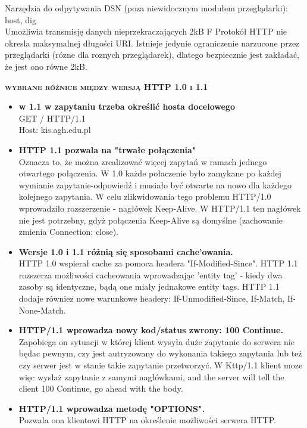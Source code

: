 Narzędzia do odpytywania DSN (poza niewidocznym modułem przeglądarki): host, dig\\




\vspace{0.4cm}
\noindent 
{Umożliwia transmisję danych nieprzekraczających 2kB}
{F}
{Protokół HTTP nie okresla maksymalnej długości URI. Istnieje jedynie ograniczenie narzucone przez przeglądarki (rózne dla roznych przeglądarek), dlatego bezpiecznie  jest zakładać, że jest ono równe 2kB.}
{\\}

\textsc{\textbf{wybrane różnice między wersją HTTP 1.0 i 1.1}}
\begin{itemize}

\item{\textbf{w  1.1 w zapytaniu trzeba określić hosta docelowego}\\
GET / HTTP/1.1 \\
Host: kis.agh.edu.pl}
\item \textbf{HTTP 1.1 pozwala na "trwałe połączenia"} \\ 
Oznacza to, że można zrealizować więcej zapytań w ramach jednego otwartego połączenia. W 1.0 każde połaczenie było zamykane po każdej wymianie zapytanie-odpowiedź i musiało być otwarte na nowo dla każdego kolejnego zapytania. W celu zlikwidowania tego problemu HTTP/1.0 wprowadziło rozszerzenie - nagłówek Keep-Alive. W HTTP/1.1 ten nagłówek nie jest potrzebny, gdyż połączenia Keep-Alive są domyślne (zachowanie zmienia Connection: close).

\item \textbf{Wersje 1.0 i 1.1 różnią się sposobami cache'owania.} \\
HTTP 1.0 wspierał cache za pomoca headera "If-Modified-Since". HTTP 1.1 rozszerza możliwości cacheowania wprowadzając 'entity tag' - kiedy dwa zasoby są identyczne, bądą one miały jednakowe entity tags. HTTP 1.1 dodaje równiez nowe warunkowe headery: If-Unmodified-Since, If-Match, If-None-Match.

\item \textbf{HTTP/1.1 wprowadza nowy kod/status zwrony: 100 Continue.} \\
Zapobiega on sytuacji w której klient wysyła duże zapytanie do serwera nie będac pewnym, czy jest autryzowany do wykonania takiego zapytania lub też czy serwer jest w stanie takie zapytanie przetworzyć. W Kttp/1.1 klient moze więc wysłaż zapytanie z samymi nagłówkami, and the server will tell the client 100 Continue, go ahead with the body.

\item \textbf{HTTP/1.1 wprowadza metodę "OPTIONS".} \\
Pozwala ona klientowi HTTP na określenie możliwości serwera HTTP. 
\end{itemize}

